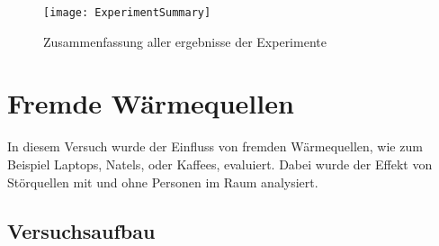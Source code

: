 \begin{figure}[H]
	\centering
	\texttt{[image: ExperimentSummary]}
	\caption{Zusammenfassung aller ergebnisse der Experimente}
	\label{fig:ExperimentSummary}
\end{figure}



\section{Fremde Wärmequellen}
\label{sec:FremdeWärmequellen}

In diesem Versuch wurde der Einfluss von fremden Wärmequellen, wie zum Beispiel Laptops, Natels, oder Kaffees, evaluiert. Dabei wurde der Effekt von Störquellen mit und ohne Personen im Raum analysiert.

\subsection{Versuchsaufbau}

